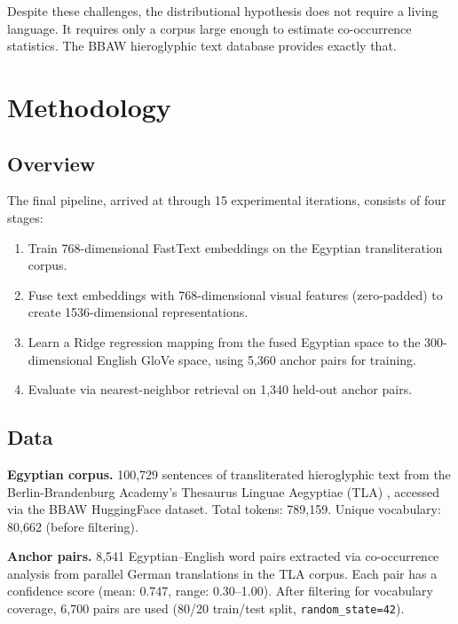 \documentclass[11pt, a4paper]{article}
\begin{document}
Despite these challenges, the distributional hypothesis does not require a living language. It requires only a corpus large enough to estimate co-occurrence statistics. The BBAW hieroglyphic text database \citep{bbaw_tla} provides exactly that.

\section{Methodology}
\label{sec:methodology}

\subsection{Overview}

The final pipeline, arrived at through 15 experimental iterations, consists of four stages:

\begin{enumerate}[nosep]
    \item Train 768-dimensional FastText embeddings on the Egyptian transliteration corpus.
    \item Fuse text embeddings with 768-dimensional visual features (zero-padded) to create 1536-dimensional representations.
    \item Learn a Ridge regression mapping from the fused Egyptian space to the 300-dimensional English GloVe space, using 5,360 anchor pairs for training.
    \item Evaluate via nearest-neighbor retrieval on 1,340 held-out anchor pairs.
\end{enumerate}

\subsection{Data}

\textbf{Egyptian corpus.} 100,729 sentences of transliterated hieroglyphic text from the Berlin-Brandenburg Academy's Thesaurus Linguae Aegyptiae (TLA) \citep{bbaw_tla}, accessed via the BBAW HuggingFace dataset. Total tokens: 789,159. Unique vocabulary: 80,662 (before filtering).

\textbf{Anchor pairs.} 8,541 Egyptian--English word pairs extracted via co-occurrence analysis from parallel German translations in the TLA corpus. Each pair has a confidence score (mean: 0.747, range: 0.30--1.00). After filtering for vocabulary coverage, 6,700 pairs are used (80/20 train/test split, \texttt{random\_state=42}).
\end{document}
